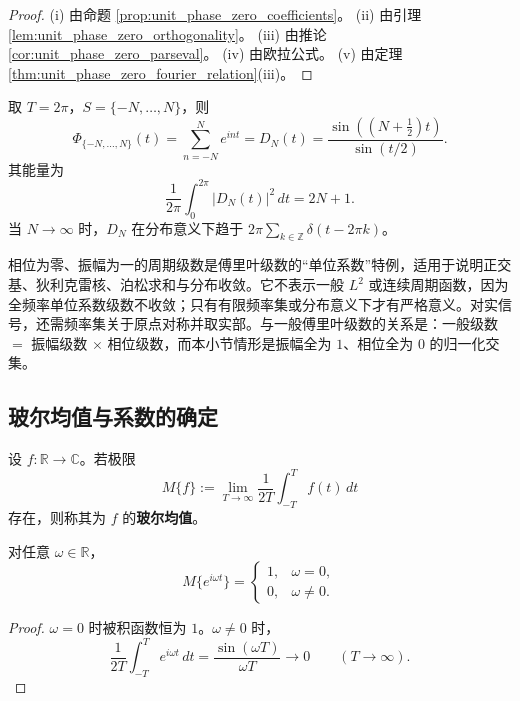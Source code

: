 \begin{proof}
(i) 由命题 \ref{prop:unit_phase_zero_coefficients}。 (ii) 由引理 \ref{lem:unit_phase_zero_orthogonality}。 (iii) 由推论 \ref{cor:unit_phase_zero_parseval}。 (iv) 由欧拉公式。 (v) 由定理 \ref{thm:unit_phase_zero_fourier_relation}(iii)。
\end{proof}

\begin{example}[狄利克雷核作为有限归一化周期级数]\label{ex:dirichlet_kernel_truncation}
取 $T=2\pi$，$S=\{-N,\dots,N\}$，则
\[
\Phi_{\{-N,\dots,N\}}(t)
=\sum_{n=-N}^{N}e^{int}
=D_N(t)
=\frac{\sin((N+\tfrac12)t)}{\sin(t/2)}.
\]
其能量为
\[
\frac{1}{2\pi}\int_0^{2\pi}|D_N(t)|^2\,dt=2N+1.
\]
当 $N\to\infty$ 时，$D_N$ 在分布意义下趋于 $2\pi\sum_{k\in\mathbb{Z}}\delta(t-2\pi k)$。
\end{example}

\begin{remark}\label{rem:unit_phase_zero_scope}
相位为零、振幅为一的周期级数是傅里叶级数的“单位系数”特例，适用于说明正交基、狄利克雷核、泊松求和与分布收敛。它不表示一般 $L^2$ 或连续周期函数，因为全频率单位系数级数不收敛；只有有限频率集或分布意义下才有严格意义。对实信号，还需频率集关于原点对称并取实部。与一般傅里叶级数的关系是：一般级数 $=$ 振幅级数 $\times$ 相位级数，而本小节情形是振幅全为 $1$、相位全为 $0$ 的归一化交集。
\end{remark}

\subsection{\texorpdfstring{玻尔均值与系数的确定}{玻尔均值与系数的确定}}

\begin{definition}[玻尔均值]\label{def:bohr_mean}
设 $f: \mathbb{R} \to \mathbb{C}$。若极限
\[
M\{f\} := \lim_{T \to \infty} \frac{1}{2T} \int_{-T}^{T} f(t)\,dt
\]
存在，则称其为 $f$ 的\textbf{玻尔均值}。
\end{definition}

\begin{lemma}[指数函数的玻尔均值]\label{lem:bohr_mean_exponential}
对任意 $\omega \in \mathbb{R}$，
\[
M\{e^{i\omega t}\} =
\begin{cases}
1, & \omega = 0, \\
0, & \omega \neq 0.
\end{cases}
\]
\end{lemma}

\begin{proof}
$\omega = 0$ 时被积函数恒为 $1$。$\omega \neq 0$ 时，
\[
\frac{1}{2T}\int_{-T}^{T} e^{i\omega t}\,dt = \frac{\sin(\omega T)}{\omega T} \to 0 \qquad (T \to \infty).
\]
\end{proof}

